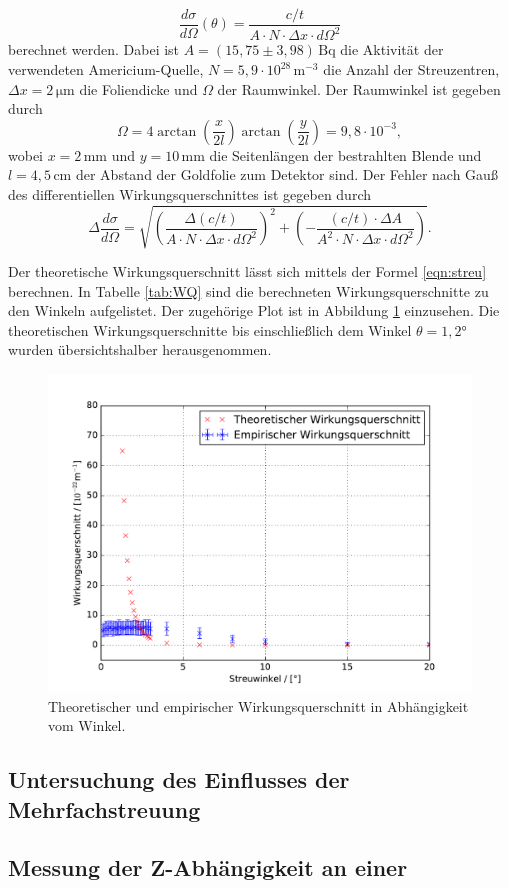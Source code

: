 \begin{equation}
  \frac{d\sigma}{d\Omega}(\theta) = \frac{c/t}{A\cdot{N}\cdot\Delta{x}\cdot d\Omega^2}
\end{equation}
berechnet werden.
Dabei ist $A = (15,75\pm3,98)\,\text{Bq}$ die Aktivität der verwendeten Americium-Quelle, $N = 5,9\cdot10^{28}\,\text{m}^{-3}$ die Anzahl der Streuzentren,
$\Delta{x} = 2\,\si{\micro\metre}$ die Foliendicke und $\Omega$ der Raumwinkel.
Der Raumwinkel ist gegeben durch
\begin{equation}
  \Omega = 4\arctan\left( \frac{x}{2l} \right)\arctan\left( \frac{y}{2l} \right) = 9,8\cdot10^{-3},
\end{equation}
wobei $x = 2\,\text{mm}$ und $y=10\,\text{mm}$ die Seitenlängen der bestrahlten Blende und
$l = 4,5\,\text{cm}$ der Abstand der Goldfolie zum Detektor sind.
Der Fehler nach Gauß des differentiellen Wirkungsquerschnittes ist gegeben durch
\begin{equation}
  \Delta{\frac{d\sigma}{d\Omega}} = \sqrt{ \left(\frac{\Delta(c/t)}{A\cdot{N}\cdot\Delta{x}\cdot d\Omega^2}\right)^2 + \left( -\frac{(c/t)\cdot\Delta{A}}{A^2\cdot{N}\cdot\Delta{x}\cdot d\Omega^2} \right) }.
\end{equation}

Der theoretische Wirkungsquerschnitt lässt sich mittels der Formel \eqref{eqn:streu} berechnen.
In Tabelle \ref{tab:WQ} sind die berechneten Wirkungsquerschnitte zu den Winkeln aufgelistet.
Der zugehörige Plot ist in Abbildung \ref{fig:WQ} einzusehen.
Die theoretischen Wirkungsquerschnitte bis einschließlich dem Winkel $\theta = 1,2°$ wurden übersichtshalber herausgenommen.

\begin{figure}[H]
  \centering
  \includegraphics[width=\textwidth]{WQ.pdf}
  \caption{Theoretischer und empirischer Wirkungsquerschnitt in Abhängigkeit vom Winkel.}
  \label{fig:WQ}
\end{figure}


\subsection{Untersuchung des Einflusses der Mehrfachstreuung}

\subsection{Messung der Z-Abhängigkeit an einer }
